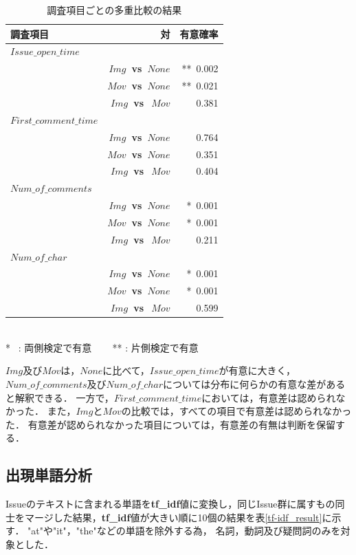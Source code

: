 \begin{table}[t]
  \begin{center}
  \caption{調査項目ごとの多重比較の結果}
  \begin{tabular}{l r|r}
    \hline
    調査項目 & 対 & 有意確率 \\
    \hline \hline
    $Issue\_open\_time$ & & \\
     & \bf{$Img$~vs~$None$} & **~0.002 \\
     & \bf{$Mov$~vs~$None$} & **~0.021 \\
     & \bf{$Img$~vs~$~Mov$} & 0.381 \\
    \hline
    $First\_comment\_time$ & & \\
     & \bf{$Img$~vs~$None$} & 0.764 \\
     & \bf{$Mov$~vs~$None$} & 0.351 \\
     & \bf{$Img$~vs~$~Mov$} & 0.404 \\
    \hline
    $Num\_of\_comments$ & & \\
     & \bf{$Img$~vs~$None$} & *~0.001 \\
     & \bf{$Mov$~vs~$None$} & *~0.001 \\
     & \bf{$Img$~vs~$~Mov$} & 0.211 \\
    \hline
    $Num\_of\_char$ & & \\
     & \bf{$Img$~vs~$None$} & *~0.001 \\
     & \bf{$Mov$~vs~$None$} & *~0.001 \\
     & \bf{$Img$~vs~$~Mov$} & 0.599 \\
    \hline
  \end{tabular}\\
  \small
    *~ : 両側検定で有意 ~~~ ** : 片側検定で有意\\
  \label{Steel-Dwass_result}
  \end{center}
\end{table}

$Img$及び$Mov$は，$None$に比べて，$Issue\_open\_time$が有意に大きく，
$Num\_of\_comments$及び$Num\_of\_char$については分布に何らかの有意な差があると解釈できる．
一方で，$First\_comment\_time$においては，有意差は認められなかった．
また，$Img$と$Mov$の比較では，すべての項目で有意差は認められなかった．
有意差が認められなかった項目については，有意差の有無は判断を保留する．

\subsection{出現単語分析}
Issueのテキストに含まれる単語を\textbf{tf\_idf}値に変換し，同じIssue群に属すもの同士をマージした結果，\textbf{tf\_idf}値が大きい順に10個の結果を表\ref{tf-idf_result}に示す．
"at"や"it"，"the"などの単語を除外する為，
名詞，動詞及び疑問詞のみを対象とした． \\

